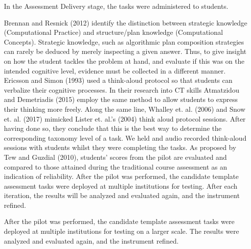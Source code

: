 In the Assessment Delivery stage, the tasks were administered to students.



Brennan and Resnick (2012) identify the distinction between strategic knowledge (Computational Practice) and structure/plan knowledge (Computational Concepts). Strategic knowledge, such as algorithmic plan composition strategies can rarely be deduced by merely inspecting a given answer. Thus, to give insight on how the student tackles the problem at hand, and evaluate if this was on the intended cognitive level, evidence must be collected in a different manner.  Ericsson and Simon (1993) used a think-aloud protocol so that students can verbalize their cognitive processes. In their research into CT skills Atmatzidou and Demetriadis (2015) employ the same method to allow students to express their thinking more freely. Along the same line, Whalley et. al. (2006) and Snow et. al. (2017) mimicked Lister et. al.'s (2004) think aloud protocol sessions. After having done so, they conclude that this is the best way to determine the corresponding taxonomy level of a task. We held and audio recorded think-aloud sessions with students whilst they were completing the tasks. As proposed by Tew and Guzdial (2010), students' scores from the pilot are evaluated and compared to those attained during the traditional course assessment as an indication of reliability. After the pilot was performed, the candidate template assessment tasks were deployed at multiple institutions for testing. After each iteration, the results will be analyzed and evaluated again, and the instrument refined.

After the pilot was performed, the  candidate template assessment tasks were deployed at multiple institutions for testing on a larger scale. The results were analyzed and evaluated again, and the instrument refined.

